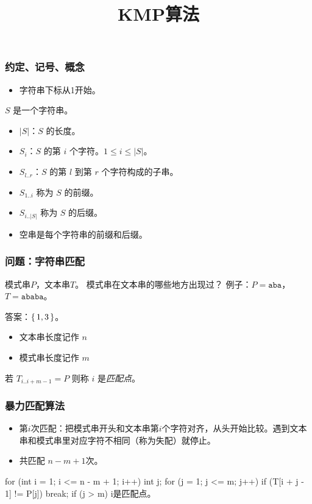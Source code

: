 \documentclass{ctexbeamer}
\newcommand{\str}[1]{\texttt{#1}}
\begin{document}
\title{KMP算法}
\maketitle

\begin{frame}
  \frametitle{约定、记号、概念}

  \begin{itemize}
    \item 字符串下标从1开始。
  \end{itemize}


$S$ 是一个字符串。
\begin{itemize}
\item $|S|$：$S$ 的长度。
\item  $S_i$：$S$ 的第 $i$ 个字符。$1 \le i \le |S|$。
\item $S_{l..r}$：$S$ 的第 $l$ 到第 $r$ 个字符构成的子串。
\item $S_{1..i}$ 称为 $S$ 的前缀。
\item $S_{i..|S|}$ 称为 $S$ 的后缀。
\item 空串是每个字符串的前缀和后缀。
\end{itemize}

\end{frame}
\begin{frame}[fragile]
	\frametitle{问题：字符串匹配}

  

\begin{tcolorbox}
  模式串$P$，文本串$T$。
  模式串在文本串的哪些地方出现过？
  \tcblower
  例子：$P=\str{aba}$，$T=\str{ababa}$。

  答案：$\set{1, 3}$。
\end{tcolorbox}


\begin{itemize}
\item 文本串长度记作 $n$
\item 模式串长度记作 $m$
\end{itemize}

若 $T_{i..i+m-1} = P$ 则称 $i$ 是\emph{匹配点}。

\end{frame}


\begin{frame}[fragile]
\frametitle{暴力匹配算法}

\begin{itemize}
\item 第$i$次匹配：把模式串开头和文本串第$i$个字符对齐，从头开始比较。遇到文本串和模式串里对应字符不相同（称为失配）就停止。
\item 共匹配 $n-m+1$次。
\end{itemize}


\begin{tcolorbox}
\begin{cverb}
for (int i = 1; i <= n - m + 1; i++) {
  int j;
  for (j = 1; j <= m; j++)
    if (T[i + j - 1] != P[j]) break;
  if (j > m)
    i是匹配点。
}
\end{cverb}
\end{tcolorbox}
\end{frame}
\end{document}
